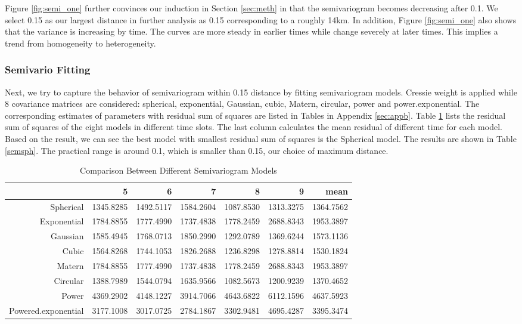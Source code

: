 \documentclass[hidelinks,12pt]{article}
\begin{document}
\FloatBarrier
	Figure \ref{fig:semi_one} further convinces our induction in Section \ref{sec:meth} in that the semivariogram becomes decreasing after 0.1. We select 0.15 as our largest distance in further analysis as 0.15 corresponding to a roughly 14km. In addition, Figure \ref{fig:semi_one} also shows that the variance is increasing by time. The curves are more steady in earlier times while change severely at later times. This implies a trend from homogeneity to heterogeneity.
	
	\subsubsection{Semivario Fitting}
	Next, we try to capture the behavior of semivariogram within 0.15 distance by fitting semivariogram models. Cressie weight is applied while 8 covariance matrices are considered: spherical, exponential, Gaussian, cubic, Matern, circular, power and power.exponential. The corresponding estimates of parameters with residual sum of squares are listed in Tables in Appendix \ref{sec:appb}. Table \ref{tbl:compsem} lists the residual sum of squares of the eight models in different time slots. The last column calculates the mean residual of different time for each model. Based on the result, we can see the best model with smallest residual sum of squares is the Spherical model. The results are shown in Table \ref{semsph}. The practical range is around 0.1, which is smaller than 0.15, our choice of maximum distance.
	\begin{table}[ht]
		\centering
		\caption{Comparison Between Different Semivariogram Models \label{tbl:compsem}}
		\begin{tabular}{rrrrrrr}
			\hline
			& 5 & 6 & 7 & 8 & 9 & mean \\ 
			\hline
			Spherical & 1345.8285 & 1492.5117 & 1584.2604 & 1087.8530 & 1313.3275 & 1364.7562 \\ 
			Exponential & 1784.8855 & 1777.4990 & 1737.4838 & 1778.2459 & 2688.8343 & 1953.3897 \\ 
			Gaussian & 1585.4945 & 1768.0713 & 1850.2990 & 1292.0789 & 1369.6244 & 1573.1136 \\ 
			Cubic & 1564.8268 & 1744.1053 & 1826.2688 & 1236.8298 & 1278.8814 & 1530.1824 \\ 
			Matern & 1784.8855 & 1777.4990 & 1737.4838 & 1778.2459 & 2688.8343 & 1953.3897 \\ 
			Circular & 1388.7989 & 1544.0794 & 1635.9566 & 1082.5673 & 1200.9239 & 1370.4652 \\ 
			Power & 4369.2902 & 4148.1227 & 3914.7066 & 4643.6822 & 6112.1596 & 4637.5923 \\ 
			Powered.exponential & 3177.1008 & 3017.0725 & 2784.1867 & 3302.9481 & 4695.4287 & 3395.3474 \\ 
			\hline
		\end{tabular}
	\end{table}
\end{document}

